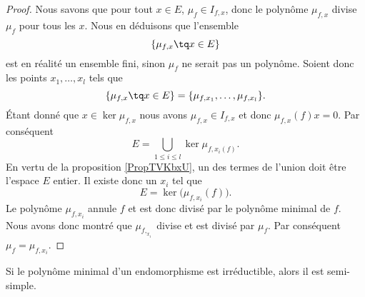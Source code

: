 \begin{proof}
    Nous savons que pour tout \( x\in E\), \( \mu_f\in I_{f,x}\), donc le polynôme \( \mu_{f,x}\) divise \( \mu_f\) pour tous les \( x\). Nous en déduisons que l'ensemble
    \begin{equation}
        \{ \mu_{f,x}\tq x\in E \}
    \end{equation}
    est en réalité un ensemble fini, sinon \( \mu_f\) ne serait pas un polynôme. Soient donc les points \( x_1,\ldots, x_l\) tels que
    \begin{equation}
        \{ \mu_{f,x}\tq x\in E \}=\{ \mu_{f,x_1},\ldots, \mu_{f,x_l} \}.
    \end{equation}
    Étant donné que \( x\in \ker\mu_{f,x}\) nous avons \( \mu_{f,x}\in I_{f,x}\) et donc \( \mu_{f,x}(f)x=0\). Par conséquent
    \begin{equation}
        E=\bigcup_{1\leq i\leq l}\ker\mu_{f,x_i(f)}.
    \end{equation}
    En vertu de la proposition \ref{PropTVKbxU}, un des termes de l'union doit être l'espace \( E\) entier. Il existe donc un \( x_i\) tel que
    \begin{equation}
        E=\ker\big( \mu_{f,x_i}(f) \big).
    \end{equation}
    Le polynôme \( \mu_{f,x_i}\) annule \( f\) et est donc divisé par le polynôme minimal de \( f\). Nous avons donc montré que \( \mu_{f,_{x_i}}\) divise et est divisé par \( \mu_f\). Par conséquent \( \mu_f=\mu_{f,x_i}\).
\end{proof}

\begin{lemma}   \label{LemrFINYT}
    Si le polynôme minimal d'un endomorphisme est irréductible, alors il est semi-simple.
\end{lemma}

